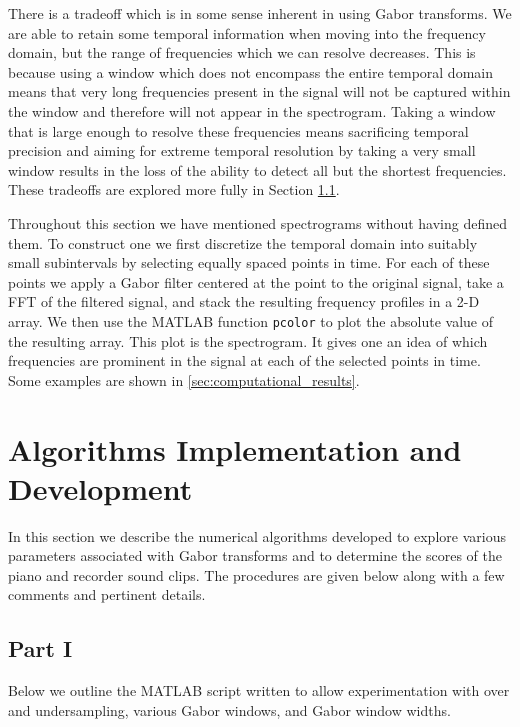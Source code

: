 \documentclass[fleqn,10pt]{../SelfArx} %
\begin{document}
There is a tradeoff which is in some sense inherent in using Gabor transforms. We are able to retain some temporal information when moving into the frequency domain, but the range of frequencies which we can resolve decreases. This is because using a window which does not encompass the entire temporal domain means that very long frequencies present in the signal will not be captured within the window and therefore will not appear in the spectrogram. Taking a window that is large enough to resolve these frequencies means sacrificing temporal precision and aiming for extreme temporal resolution by taking a very small window results in the loss of the ability to detect all but the shortest frequencies. These tradeoffs are explored more fully in Section \ref{sec:algorithms_implementation_and_development_part1}.

Throughout this section we have mentioned spectrograms without having defined them. To construct one we first discretize the temporal domain into suitably small subintervals by selecting equally spaced points in time. For each of these points we apply a Gabor filter centered at the point to the original signal, take a FFT of the filtered signal, and stack the resulting frequency profiles in a 2-D array. We then use the MATLAB function \texttt{pcolor} to plot the absolute value of the resulting array. This plot is the spectrogram. It gives one an idea of which frequencies are prominent in the signal at each of the selected points in time. Some examples are shown in \ref{sec:computational_results}.



\section{Algorithms Implementation and Development} %
\label{sec:algorithms_implementation_and_development}
In this section we describe the numerical algorithms developed to explore various parameters associated with Gabor transforms and to determine the scores of the piano and recorder sound clips. The procedures are given below along with a few comments and pertinent details.

\subsection{Part I}
\label{sec:algorithms_implementation_and_development_part1}
Below we outline the MATLAB script written to allow experimentation with over and undersampling, various Gabor windows, and Gabor window widths.
\end{document}
